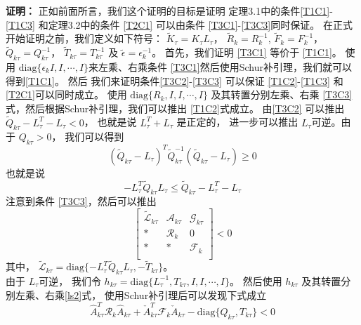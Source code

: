 	{\bf 证明：} 
	正如前面所言，我们这个证明的目标是证明 定理3.1中的条件\eqref{T1C1}-\eqref{T1C3} 和定理3.2中的条件 \eqref{T2C1} 可以由条件 \eqref{T3C1}-\eqref{T3C3}同时保证。 在正式开始证明之前，我们定义如下符号： $\tilde{K}_{\tau }=K_{\tau }L_{\tau }$， $\tilde{R}_{k}=R^{-1}_{k}$, $\tilde{F}_{k}=F^{-1}_{k}$， $\tilde{Q}_{k\tau }=Q^{-1}_{k\tau }$， $\tilde{T}_{k\tau }=T^{-1}_{k\tau }$ 及 $\tilde{\epsilon}=\epsilon^{-1}_{k}$。
	首先，我们证明 \eqref{T3C1} 等价于 \eqref{T1C1}。 使用 $\mathrm{diag}\{\epsilon_{k}I,I,\cdots,I \}$来左乘、右乘条件 \eqref{T3C1}然后使用Schur补引理，我们就可以得到\eqref{T1C1}。
	然后 我们来证明条件\eqref{T3C2}-\eqref{T3C3} 可以保证 \eqref{T1C2}-\eqref{T1C3} 和 \eqref{T2C1}可以同时成立。  使用 $\mathrm{diag}\{R_{k}, I ,I,\cdots, I \}$  及其转置分别左乘、右乘 \eqref{T3C3}式，然后根据Schur补引理，我们可以推出 \eqref{T1C2}式成立。
	由\eqref{T3C2} 可以推出$ \tilde{Q}_{k\tau}-L^{T}_{\tau }-L_{\tau }<0$， 也就是说 $L^{T}_{\tau }+L_{\tau } $ 是正定的， 进一步可以推出 $L_{\tau }$可逆。由于 $Q_{k\tau}>0$， 我们可以得到
	\begin{equation}
	(\tilde{Q}_{k\tau} - L_{\tau } )^{T}\tilde{Q}^{-1}_{k\tau }(\tilde{Q}_{k\tau} - L_{\tau } )\geq 0
	\end{equation}
	也就是说
	\begin{equation}
	-L^{T}_{\tau }\tilde{Q}_{k\tau }L_{\tau } \leq  \tilde{Q}_{k\tau}-L^{T}_{\tau }-L_{\tau }
	\end{equation}
	注意到条件 \eqref{T3C3}，然后可以推出
	\begin{equation} \label{ls2}
	\begin{bmatrix}
	\tilde{\mathscr{L}}_{k\tau }&\mathscr{A}_{k\tau }&\mathscr{G}_{k\tau }\\
	*&\mathscr{R}_{k}&0\\
	*&*&\mathscr{F}_{k}\\
	\end{bmatrix}<0
	\end{equation}
	其中， $\tilde{\mathscr{L}}_{k\tau }= \mathrm{diag}\{-L^{T}_{\tau }\tilde{Q}_{k\tau }L_{\tau },  -\tilde{T}_{k\tau } \}$。 \\
	由于 $L_{\tau }$可逆， 我们令 $h_{k\tau }= \mathrm{diag}\{L^{-1}_{\tau }, T_{k\tau }, I, I,\cdots, I \}$。 然后使用 $h_{k\tau }$ 及其转置分别左乘、右乘\eqref{ls2}式， 使用Schur补引理后可以发现下式成立
	\begin{equation} \label{ls3}
	\hat{A}^{T}_{k\tau }\mathcal{R}_{k}\hat{A}_{k\tau } + \check{A}^{T}_{k\tau }\mathcal{F}_{k}\check{A}_{k\tau }  - \mathrm{diag}\{Q_{k\tau }, T_{k\tau }\} < 0  
	\end{equation}
